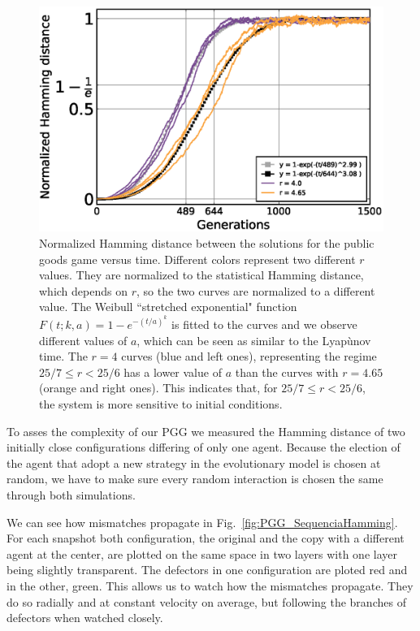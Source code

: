 \begin{figure}
	\centering
	\includegraphics[width=1\linewidth]{Images/P3/NormalHammingTimePopulation_2r.eps}
	\caption{Normalized Hamming distance between the solutions for the public goods game versus time. Different colors represent two different $r$ values. They are normalized to the statistical Hamming distance, which depends on $r$, so the two curves are normalized to a different value. The Weibull ``stretched exponential" function $F(t;k,a)=1-e^{-(t/a)^k}$ is fitted to the curves and we observe different values of $a$, which can be seen as similar to the Lyapùnov time. The $r=4$ curves (blue and left ones), representing the regime $25/7\leq r<25/6$ has a lower value of $a$ than the curves with $r=4.65$ (orange and right ones). This indicates that, for $25/7\leq r<25/6$, the system is more sensitive to initial conditions.}
	\label{fig:NormalHammingTimePopulation_2r}
\end{figure}




To asses the complexity of our PGG we measured the Hamming distance of two initially close configurations differing of only one agent. Because the election of the agent that adopt a new strategy in the evolutionary model is chosen at random, we have to make sure every random interaction is chosen the same through both simulations.


We can see how mismatches propagate in Fig.~\ref{fig:PGG_SequenciaHamming}. For each snapshot both configuration, the original and the copy with a different agent at the center, are plotted on the same space in two layers with one layer being slightly transparent. The defectors in one configuration are ploted red and in the other, green. This allows us to watch how the mismatches propagate. They do so radially and at constant velocity on average, but following the branches of defectors when watched closely.



